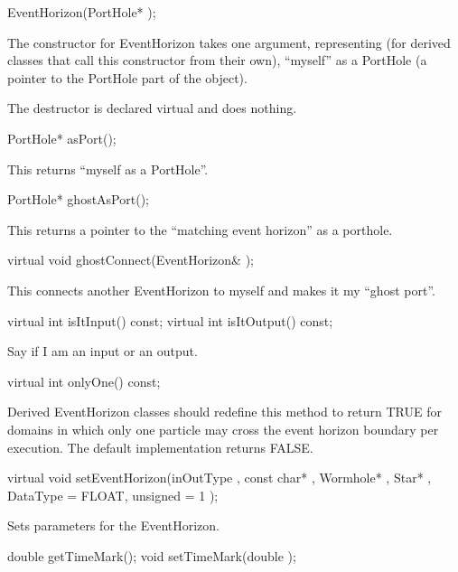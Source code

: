 \begin{example}
EventHorizon(PortHole* );
\end{example}

The constructor for EventHorizon takes one argument, representing (for
derived classes that call this constructor from their own), ``myself'' as
a PortHole (a pointer to the PortHole part of the object).

The destructor is declared virtual and does nothing.

\begin{example}
PortHole* asPort();
\end{example}

This returns ``myself as a PortHole''.

\begin{example}
PortHole* ghostAsPort();
\end{example}

This returns a pointer to the ``matching event horizon'' as a porthole.

\begin{example}
virtual void ghostConnect(EventHorizon&  );
\end{example}

This connects another EventHorizon to myself and makes it my ``ghost
port''.

\begin{example}
virtual int isItInput() const;
virtual int isItOutput() const;
\end{example}

Say if I am an input or an output.

\begin{example}
virtual int onlyOne() const;
\end{example}

Derived EventHorizon classes should redefine this method to return TRUE
for domains in which only one particle may cross the event horizon
boundary per execution.  The default implementation returns FALSE.

\begin{example}
virtual void setEventHorizon(inOutType , const char* ,
     Wormhole* , Star* ,
     DataType  = FLOAT, unsigned  = 1 );
\end{example}

Sets parameters for the EventHorizon.

\begin{example}
double getTimeMark();
void setTimeMark(double );
\end{example}

